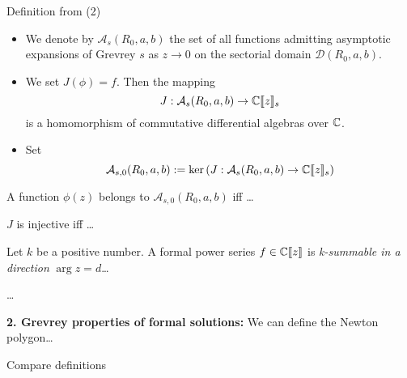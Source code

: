 \begin{frame}{Definition from \cite{zbMATH00060600} (2)}
  \begin{itemize}
    \item We denote by $\mathcal{A}_s(R_0,a,b)$ the set of all functions
    admitting asymptotic expansions of Grevrey $s$ as $z\to 0$ on the sectorial
    domain $\mathcal{D}(R_0,a,b)$.
    \item We set $J(\phi)=f$. Then the mapping
    \[
    J: \mathcal{A}_s(R_0,a,b) \to \mathbb{C}\llbracket z\rrbracket_s
    \]
    is a homomorphism of commutative differential algebras over $\mathbb{C}$.
    \item Set
    \[
    \mathcal{A}_{s,0}(R_0,a,b):=
    \ker\left(J: \mathcal{A}_s(R_0,a,b) \to \mathbb{C}\llbracket z\rrbracket_s\right)
    \]
  \end{itemize}
  \begin{lem}[1.3]
    A function $\phi(z)$ belongs to $\mathcal{A}_{s,0}(R_0,a,b)$ iff \dots
  \end{lem}
  \begin{cor}[1.4]
    $J$ is injective iff \dots
  \end{cor}
  \begin{defn}[1.5]
    Let $k$ be a positive number. A formal power series $f\in\mathbb{C}\llbracket
    z\rrbracket$ is \emph{k-summable in a direction} $\arg z=d$\dots 
  \end{defn}

  \dots

  \textbf{2. Grevrey properties of formal solutions:} We can define the Newton
  polygon\dots 
\end{frame}

\begin{frame}{Compare definitions}
\end{frame}

